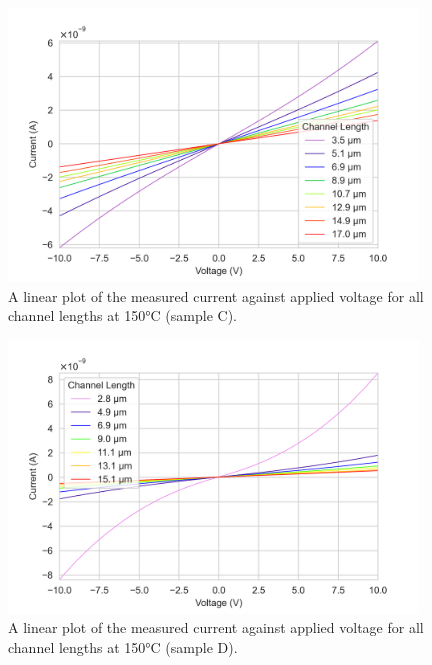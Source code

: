 \begin{figure}[h]
    \centering
    \includegraphics[width=0.97\textwidth]{Chapter6/Figs/Raster/Sample C 2019/IV/10V IV characteristics at 150 C.png}
    \caption{A linear plot of the measured current against applied voltage for all channel lengths at 150\si{\degreeCelsius} (sample C).}
    \label{fig:C_current_voltage_150}
\end{figure}
\begin{figure}[h]
    \centering
    \includegraphics[width=0.97\textwidth]{Chapter6/Figs/Raster/Sample D 2019/IV/10V IV characteristics at 150 C.png}
    \caption{A linear plot of the measured current against applied voltage for all channel lengths at 150\si{\degreeCelsius} (sample D).}
    \label{fig:D_current_voltage_150_10V}
\end{figure}


